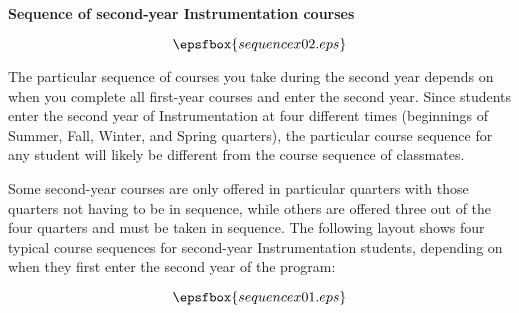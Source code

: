 


\centerline{\bf Sequence of second-year Instrumentation courses}

\vskip 10pt

$$\epsfbox{sequencex02.eps}$$  %

\filbreak

The particular sequence of courses you take during the second year depends on when you complete all first-year courses and enter the second year.  Since students enter the second year of Instrumentation at four different times (beginnings of Summer, Fall, Winter, and Spring quarters), the particular course sequence for any student will likely be different from the course sequence of classmates.

Some second-year courses are only offered in particular quarters with those quarters not having to be in sequence, while others are offered three out of the four quarters and must be taken in sequence.  The following layout shows four typical course sequences for second-year Instrumentation students, depending on when they first enter the second year of the program:

$$\epsfbox{sequencex01.eps}$$  %


\vfil

\eject


